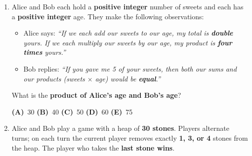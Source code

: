 \documentclass[a4paper,12pt]{article}
\newcommand{\hchoices}[5]{%
  \par\vspace{5pt}%
  \noindent\hspace{2em}%
  \textbf{(A)}~#1\hfill%
  \textbf{(B)}~#2\hfill%
  \textbf{(C)}~#3\hfill%
  \textbf{(D)}~#4\hfill%
  \textbf{(E)}~#5\par%
  \vspace{4pt}%
}
\newenvironment{choices}{%
  \begin{enumerate}[label=\textbf{(\Alph*)},
                    leftmargin=2.5em,
                    itemsep=2pt,
                    topsep=4pt,
                    parsep=0pt]%
}{%
  \end{enumerate}%
}
\begin{document}
\begin{enumerate}[label=\textbf{Q\arabic*.},
                  itemsep=3.5ex,
                  leftmargin=3.8em,
                  parsep=0pt,
                  start=13]
\begin{center}
\end{center}

Which of the following is a cycle with a \textbf{negative} total weight?

\begin{choices}
  \item Node $1 \to 2 \to 3 \to 1$
  \item Node $2 \to 3 \to 4 \to 2$
  \item Node $1 \to 4 \to 2 \to 3 \to 1$
  \item Node $1 \to 4 \to 3 \to 1$
  \item No cycle in this graph has a negative total weight
\end{choices}

\item Alice and Bob each hold a \textbf{positive integer} number of sweets
and each has a \textbf{positive integer} age. They make the following
observations:

\begin{itemize}[nosep, leftmargin=2em, topsep=2pt]
  \item Alice says: \textit{``If we each add our sweets to our age, my total
        is \textbf{double} yours. If we each multiply our sweets by our age,
        my product is \textbf{four times} yours.''}
  \item Bob replies: \textit{``If you gave me 5 of your sweets, then both our
        sums \emph{and} our products (sweets $\times$ age) would be
        \textbf{equal}.''}
\end{itemize}

What is the \textbf{product of Alice's age and Bob's age}?

\hchoices{30}{40}{50}{60}{75}

\item Alice and Bob play a game with a heap of \textbf{30 stones}.
Players alternate turns; on each turn the current player removes exactly
\textbf{1, 3, or 4} stones from the heap. The player who takes the
\textbf{last stone wins}.


\end{enumerate}
\end{document}
